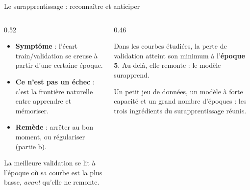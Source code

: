 \begin{frame}{Le surapprentissage : reconnaître et anticiper}
\begin{columns}[t]
\begin{column}{0.52\textwidth}
\begin{itemize}
  \item \textbf{Symptôme} : l'écart train/validation se creuse à partir d'une
  certaine époque.
  \item \textbf{Ce n'est pas un échec} : c'est la frontière naturelle entre
  apprendre et mémoriser.
  \item \textbf{Remède} : arrêter au bon moment, ou régulariser (partie b).
\end{itemize}
\begin{kbox}
La meilleure validation se lit à l'époque où sa courbe est la plus basse,
\emph{avant} qu'elle ne remonte.
\end{kbox}
\end{column}
\begin{column}{0.46\textwidth}
\begin{ebox}
Dans les courbes étudiées, la perte de validation atteint son minimum à
l'\textbf{époque 5}. Au-delà, elle remonte : le modèle surapprend.
\end{ebox}
\begin{wbox}
Un petit jeu de données, un modèle à forte capacité et un grand nombre
d'époques : les trois ingrédients du surapprentissage réunis.
\end{wbox}
\end{column}
\end{columns}
\end{frame}

